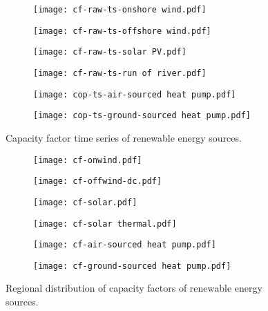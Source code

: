 \begin{figure}
    \centering
        \begin{subfigure}[t]{0.49\textwidth}
            \centering
        \texttt{[image: cf-raw-ts-onshore wind.pdf]}
    \end{subfigure}
    \begin{subfigure}[t]{0.49\textwidth}
        \centering
        \texttt{[image: cf-raw-ts-offshore wind.pdf]}
    \end{subfigure}
    \begin{subfigure}[t]{0.49\textwidth}
        \centering
        \texttt{[image: cf-raw-ts-solar PV.pdf]}
    \end{subfigure}
    \begin{subfigure}[t]{0.49\textwidth}
        \centering
        \texttt{[image: cf-raw-ts-run of river.pdf]}
    \end{subfigure}
    \begin{subfigure}[t]{0.49\textwidth}
        \centering
        \texttt{[image: cop-ts-air-sourced heat pump.pdf]}
    \end{subfigure}
    \begin{subfigure}[t]{0.49\textwidth}
        \centering
        \texttt{[image: cop-ts-ground-sourced heat pump.pdf]}
    \end{subfigure}
    \caption{Capacity factor time series of renewable energy sources.}
    \label{fig:cfs-ts}
\end{figure}

\begin{figure}
    \centering
    \begin{subfigure}[t]{0.49\textwidth}
        \centering
        \texttt{[image: cf-onwind.pdf]}
    \end{subfigure}
    \begin{subfigure}[t]{0.49\textwidth}
        \centering
        \texttt{[image: cf-offwind-dc.pdf]}
    \end{subfigure}
    \begin{subfigure}[t]{0.49\textwidth}
        \centering
        \texttt{[image: cf-solar.pdf]}
    \end{subfigure}
    \begin{subfigure}[t]{0.49\textwidth}
        \centering
        \texttt{[image: cf-solar thermal.pdf]}
    \end{subfigure}
    \begin{subfigure}[t]{0.49\textwidth}
        \centering
        \texttt{[image: cf-air-sourced heat pump.pdf]}
    \end{subfigure}
    \begin{subfigure}[t]{0.49\textwidth}
        \centering
        \texttt{[image: cf-ground-sourced heat pump.pdf]}
    \end{subfigure}
    \caption{Regional distribution of capacity factors of renewable energy sources.}
    \label{fig:cfs-maps}
\end{figure}


